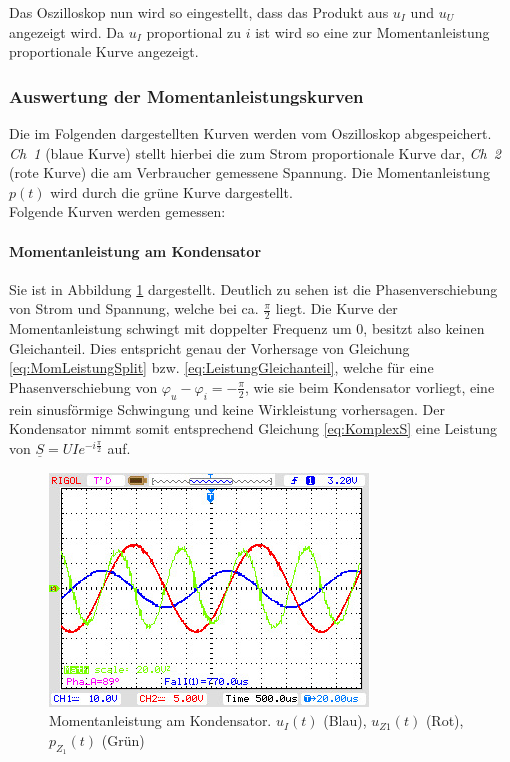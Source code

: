 Das Oszilloskop nun wird so eingestellt, dass das Produkt aus $u_I$ und $u_U$ angezeigt wird. Da $u_I$ proportional zu $i$ ist wird so eine zur Momentanleistung proportionale Kurve angezeigt.

\subsubsection{Auswertung der Momentanleistungskurven}

Die im Folgenden dargestellten Kurven werden vom Oszilloskop abgespeichert. \textit{Ch~1} (blaue Kurve) stellt hierbei die zum Strom proportionale Kurve dar, \textit{Ch~2} (rote Kurve) die am Verbraucher gemessene Spannung. Die Momentanleistung $p(t)$ wird durch die grüne Kurve dargestellt.
\\
Folgende Kurven werden gemessen:

\paragraph{Momentanleistung am Kondensator}
Sie ist in Abbildung \ref{fig:MomLKurveZ1} dargestellt. Deutlich zu sehen ist die Phasenverschiebung von Strom und Spannung, welche bei ca. $\frac{\pi}{2}$ liegt. Die Kurve der Momentanleistung schwingt mit doppelter Frequenz um 0, besitzt also keinen Gleichanteil. Dies entspricht genau der Vorhersage von Gleichung \eqref{eq:MomLeistungSplit} bzw. \eqref{eq:LeistungGleichanteil}, welche für eine Phasenverschiebung von $\varphi_u - \varphi_i = -\frac{\pi}{2}$, wie sie beim Kondensator vorliegt, eine rein sinusförmige Schwingung und keine Wirkleistung vorhersagen. Der Kondensator nimmt somit entsprechend Gleichung \eqref{eq:KomplexS} eine Leistung von $\underline{S} = UIe^{-i\frac{\pi}{2}}$ auf.\par

\begin{figure}[H]
\centering
\includegraphics[width=0.7\linewidth]{Oszi-Bitmaps/NewFile0.jpg}
\caption{Momentanleistung am Kondensator. $u_I(t)$ (Blau), $u_{Z1}(t)$ (Rot), $p_{Z_1}(t)$ (Grün)}
\label{fig:MomLKurveZ1}
\end{figure}

